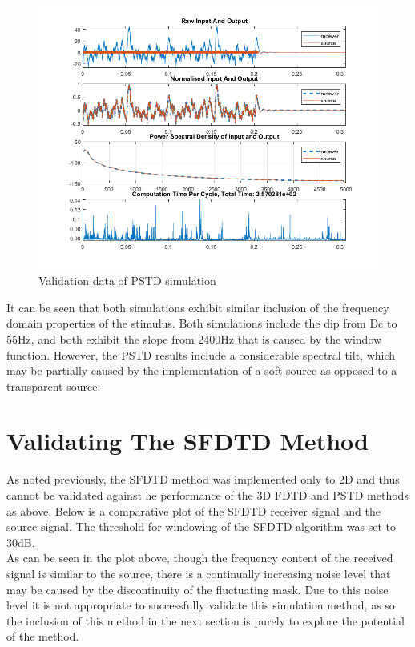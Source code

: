 \begin{figure}[H]
\centering
  \includegraphics[width=\textwidth]{./graphics/PSTDvalidation10k.png}
  \caption{Validation data of PSTD simulation}
\end{figure}

It can be seen that both simulations exhibit similar inclusion of the frequency domain properties of the stimulus. Both simulations include the dip from Dc to 55Hz, and both exhibit the slope from 2400Hz that is caused by the window function. However, the PSTD results include a considerable spectral tilt, which may be partially caused by the implementation of a soft source as opposed to a transparent source.\\


\section{Validating The SFDTD Method}
As noted previously, the SFDTD method was implemented only to 2D and thus cannot be validated against he performance of the 3D FDTD and PSTD methods as above. Below is a comparative plot of the SFDTD receiver signal and the source signal. The threshold for windowing of the SFDTD algorithm was set to 30dB.\\

As can be seen in the plot above, though the frequency content of the received signal is similar to the source, there is a continually increasing noise level that may be caused by the discontinuity of the fluctuating mask. Due to this noise level it is not appropriate to successfully validate this simulation method, as so the inclusion of this method in the next section is purely to explore the potential of the method.\\ 